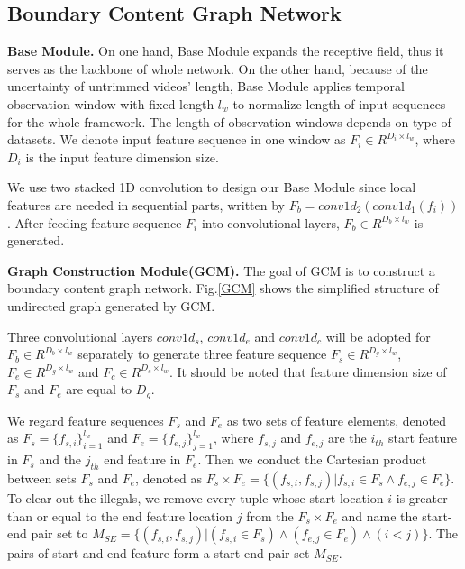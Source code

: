 \documentclass[runningheads]{llncs}
\begin{document}
\subsection{Boundary Content Graph Network}


\noindent\textbf{Base Module.}
On one hand, Base Module expands the receptive field, thus it serves as the backbone of whole network. On the other hand, because of the uncertainty of untrimmed videos' length, Base Module applies temporal observation window with fixed length $l_w$ to normalize length of input sequences for the whole framework. The length of observation windows depends on type of datasets. We denote input feature sequence in one window as $F_i \in R^{D_i \times l_w}$, where $D_i$ is the input feature dimension size.

We use two stacked 1D convolution to design our Base Module since local features are needed in sequential parts, written by $F_b = conv1d_{2}(conv1d_{1}(f_i))$. After feeding feature sequence $F_i$ into convolutional layers, $F_b \in R^{D_b \times l_w}$ is generated. 

\noindent\textbf{Graph Construction Module(GCM).}
The goal of GCM is to construct a boundary content graph network. Fig.\ref{GCM} shows the simplified structure of undirected graph generated by GCM.

Three convolutional layers $conv1d_{s}$, $conv1d_{e}$ and $conv1d_{c}$ will be adopted for $F_b \in R^{D_b \times l_w}$ separately to generate three feature sequence $F_s \in R^{D_g \times l_w}$, $F_e \in R^{D_g \times l_w}$ and $F_c \in R^{D_c \times l_w}$. It should be noted that feature dimension size of $F_s$ and $F_e$ are equal to $D_g$.

 We regard feature sequences $F_s$ and $F_e$ as two sets of feature elements, denoted as $F_s = \{f_{s,i}\}_{i=1}^{l_w}$ and $F_e = \{f_{e,j}\}_{j=1}^{l_w}$, where $f_{s,j}$ and $f_{e,j}$ are the $i_{th}$ start feature in $F_s$ and the $j_{th}$ end feature in $F_e$. Then we conduct the Cartesian product between sets $F_s$ and $F_e$, denoted as $F_s \times F_e = \{(f_{s,i}, f_{s,j})|f_{s,i}\in F_s \land f_{e,j} \in F_e\}$.  To clear out the illegals, we remove every tuple whose start location $i$ is greater than or equal to the end feature location $j$ from the $F_s \times F_e$ and name the start-end pair set to $M_{SE} = \{(f_{s,i}, f_{s,j})|(f_{s,i}\in F_s) \land (f_{e,j} \in F_e) \land (i < j)\}$. The pairs of start and end feature form a start-end pair set $M_{SE}$.
\end{document}
